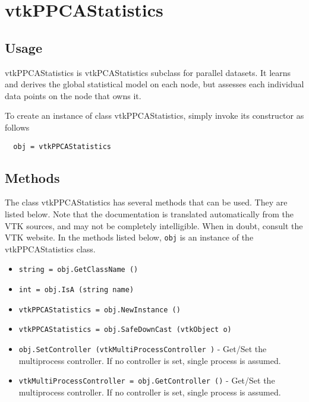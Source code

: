 \section{vtkPPCAStatistics}

\subsection{Usage}

 vtkPPCAStatistics is vtkPCAStatistics subclass for parallel datasets.
 It learns and derives the global statistical model on each node, but assesses each 
 individual data points on the node that owns it.

To create an instance of class vtkPPCAStatistics, simply
invoke its constructor as follows
\begin{verbatim}
  obj = vtkPPCAStatistics
\end{verbatim}
\subsection{Methods}

The class vtkPPCAStatistics has several methods that can be used.
  They are listed below.
Note that the documentation is translated automatically from the VTK sources,
and may not be completely intelligible.  When in doubt, consult the VTK website.
In the methods listed below, \verb|obj| is an instance of the vtkPPCAStatistics class.
\begin{itemize}
\item  \verb|string = obj.GetClassName ()|

\item  \verb|int = obj.IsA (string name)|

\item  \verb|vtkPPCAStatistics = obj.NewInstance ()|

\item  \verb|vtkPPCAStatistics = obj.SafeDownCast (vtkObject o)|

\item  \verb|obj.SetController (vtkMultiProcessController )| -  Get/Set the multiprocess controller. If no controller is set,
 single process is assumed.

\item  \verb|vtkMultiProcessController = obj.GetController ()| -  Get/Set the multiprocess controller. If no controller is set,
 single process is assumed.

\end{itemize}
